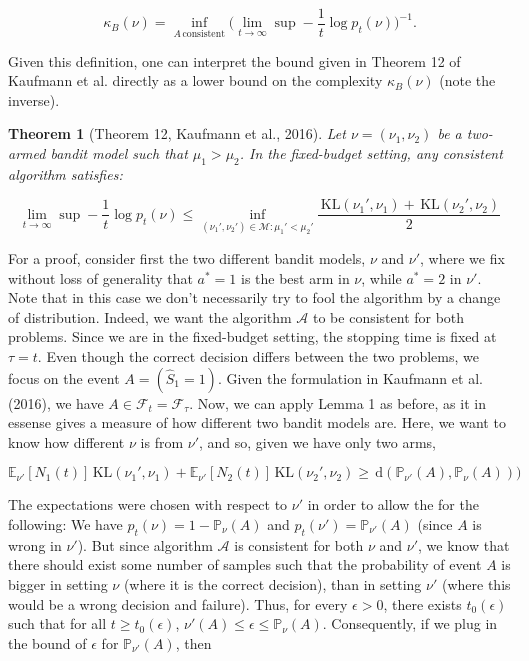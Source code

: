 \documentclass[12pt,]{article}
\newtheorem{theorem}{Theorem}
\newcommand{\KL}{\,\text{KL}}
\newcommand{\der}{\,\text{d}}
\begin{document}
\begin{equation}
\kappa_B(\nu) = \inf_{A \, \text{consistent}} \big(\lim_{t \to \infty} \sup - \frac{1}{t} \log p_t(\nu)\big)^{-1}.
\end{equation}

Given this definition, one can interpret the bound given in Theorem 12
of Kaufmann et al. directly as a lower bound on the complexity
\(\kappa_B(\nu)\) (note the inverse).

\begin{theorem}[Theorem 12, Kaufmann et al., 2016] \label{theorem:KaufmannEtAlTheorem12}
Let $\nu = (\nu_1, \nu_2)$ be a two-armed bandit model such that $\mu_1 > \mu_2$. In the fixed-budget setting, any consistent algorithm satisfies:

\begin{equation*}
\lim_{t \to \infty} \sup - \frac{1}{t} \log p_t(\nu) \leq \inf_{(\nu_1', \nu_2') \in \mathcal{M}: \mu_1' < \mu_2'} \frac{\KL(\nu_1', \nu_1) + \KL(\nu_2', \nu_2)}{2}
\end{equation*}
\end{theorem}

For a proof, consider first the two different bandit models, \(\nu\) and
\(\nu'\), where we fix without loss of generality that \(a^* = 1\) is
the best arm in \(\nu\), while \(a^* = 2\) in \(\nu'\). Note that in
this case we don't necessarily try to fool the algorithm by a change of
distribution. Indeed, we want the algorithm \(\mathcal{A}\) to be
consistent for both problems. Since we are in the fixed-budget setting,
the stopping time is fixed at \(\tau = t\). Even though the correct
decision differs between the two problems, we focus on the event
\(A = (\hat{S}_1 = 1)\). Given the formulation in Kaufmann et al.
(2016), we have \(A \in \mathcal{F}_t = \mathcal{F}_{\tau}\). Now, we
can apply Lemma 1 as before, as it in essense gives a measure of how
different two bandit models are. Here, we want to know how different
\(\nu\) is from \(\nu'\), and so, given we have only two arms,

\begin{equation*}
\mathbb{E}_{\nu'}[N_1(t)]\KL(\nu_1', \nu_1) + \mathbb{E}_{\nu'}[N_2(t)]\KL(\nu_2', \nu_2) \geq \der(\mathbb{P}_{\nu'}(A),\mathbb{P}_{\nu}(A)))
\end{equation*}

The expectations were chosen with respect to \(\nu'\) in order to allow
the for the following: We have \(p_t(\nu) = 1 - \mathbb{P}_{\nu}(A)\)
and \(p_t(\nu') = \mathbb{P}_{\nu'}(A)\) (since \(A\) is wrong in
\(\nu'\)). But since algorithm \(\mathcal{A}\) is consistent for both
\(\nu\) and \(\nu'\), we know that there should exist some number of
samples such that the probability of event \(A\) is bigger in setting
\(\nu\) (where it is the correct decision), than in setting \(\nu'\)
(where this would be a wrong decision and failure). Thus, for every
\(\epsilon > 0\), there exists \(t_0(\epsilon)\) such that for all
\(t \geq t_0(\epsilon)\),
\(\mathbb{\nu'}(A) \leq \epsilon \leq \mathbb{P}_\nu(A)\). Consequently,
if we plug in the bound of \(\epsilon\) for \(\mathbb{P}_{\nu'}(A)\),
then
\end{document}
